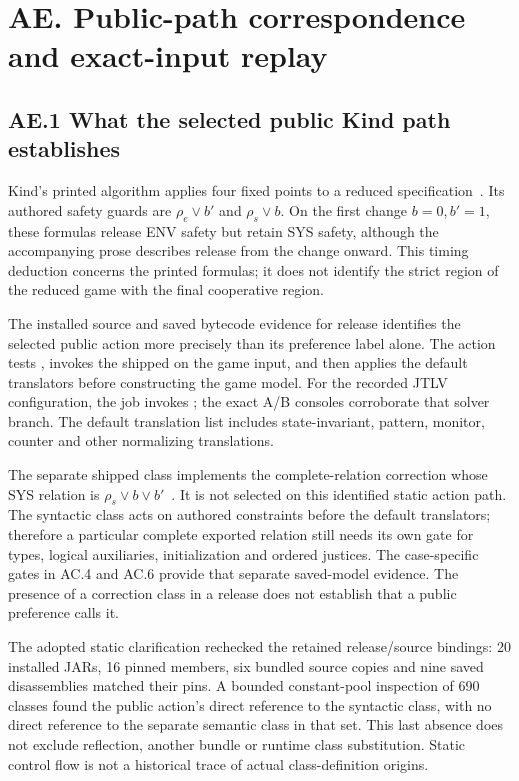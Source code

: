\clearpage
\section*{AE. Public-path correspondence and exact-input replay}
\label{supp:r7-public-path-replay}

\subsection*{AE.1 What the selected public Kind path establishes}
\label{supp:r7-static-public-path}
Kind's printed algorithm applies four fixed points to a reduced
specification~\cite[Sec.~4.1, p.~4]{kind}. Its authored safety guards are
$\rho_e\lor b'$ and $\rho_s\lor b$. On the first change $b=0,b'=1$,
these formulas release ENV safety but retain SYS safety, although the
accompanying prose describes release from the change onward.
This timing deduction concerns the printed formulas; it does not identify
the strict region of the reduced game with the final cooperative region.

The installed source and saved bytecode evidence for release
 identifies the selected public action more precisely
than its preference label alone.
The  action tests
, invokes the shipped
 on the game input, and then applies
the default translators before constructing the game model.
For the recorded JTLV configuration, the job invokes
; the exact A/B consoles corroborate that solver branch.
The default translation list includes state-invariant, pattern, monitor,
counter and other normalizing translations.

The separate shipped  class implements
the complete-relation correction whose SYS relation is
$\rho_s\lor b\lor b'$~\cite{spectrarelease2024}.
It is not selected on this identified static action path.
The syntactic class acts on authored constraints before the default
translators; therefore a particular complete exported relation still needs
its own gate for types, logical auxiliaries, initialization and ordered
justices. The case-specific gates in AC.4 and AC.6 provide that separate
saved-model evidence. The presence of a correction class in a release
does not establish that a public preference calls it.

The adopted static clarification rechecked the retained release/source
bindings: 20 installed JARs, 16 pinned members, six bundled source copies
and nine saved disassemblies matched their pins.
A bounded constant-pool inspection of 690 classes found the public action's
direct reference to the syntactic class, with no direct reference to the
separate semantic class in that set.
This last absence does not exclude reflection, another bundle or runtime
class substitution. Static control flow is not a historical trace of
actual class-definition origins.

